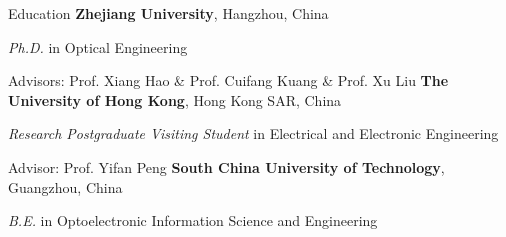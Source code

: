 \begin{rubric}{Education}
	\entry*[2018/09 -- 2023/12]%
	\textbf{Zhejiang University}, Hangzhou, China
	\par \textit{Ph.D.} in Optical Engineering
	\par Advisors: Prof. Xiang Hao \& Prof. Cuifang Kuang \& Prof. Xu Liu
	\entry*[2022/12 -- 2023/03]%
	\textbf{The University of Hong Kong}, Hong Kong SAR, China
	\par \textit{Research Postgraduate Visiting Student} in Electrical and Electronic Engineering
	\par Advisor: Prof. Yifan Peng
	\entry*[2014/09 -- 2018/06]%
	\textbf{South China University of Technology}, Guangzhou, China
	\par \textit{B.E.} in Optoelectronic Information Science and Engineering
\end{rubric}